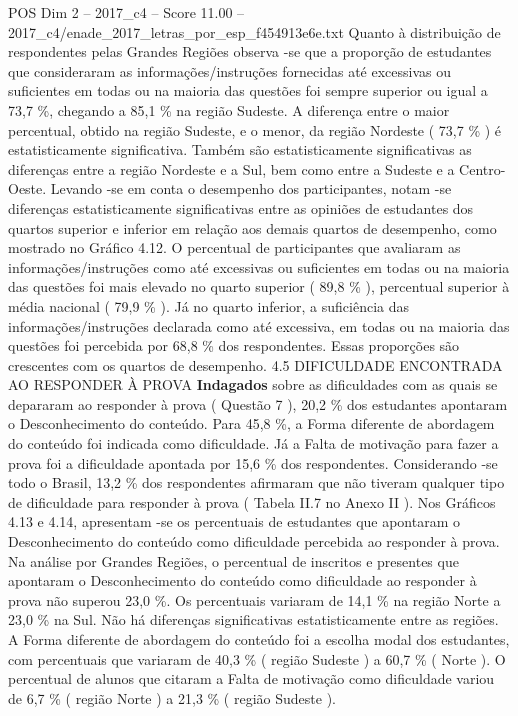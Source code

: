 \begin{textsample}{POS Dim 2 – 2017\_c4 – Score 11.00 – 2017\_c4/enade\_2017\_letras\_por\_esp\_f454913e6e.txt}
Quanto à distribuição de respondentes pelas Grandes Regiões observa -se que a proporção de estudantes que consideraram as informações/instruções fornecidas até excessivas ou suficientes em todas ou na maioria das questões foi sempre superior ou igual a 73,7 \%, chegando a 85,1 \% na região Sudeste.
A diferença entre o maior percentual, obtido na região Sudeste, e o menor, da região Nordeste ( 73,7 \% ) é estatisticamente significativa.
Também são estatisticamente significativas as diferenças entre a região Nordeste e a Sul, bem como entre a Sudeste e a Centro-Oeste.
Levando -se em conta o desempenho dos participantes, notam -se diferenças estatisticamente significativas entre as opiniões de estudantes dos quartos superior e inferior em relação aos demais quartos de desempenho, como mostrado no Gráfico 4.12.
O percentual de participantes que avaliaram as informações/instruções como até excessivas ou suficientes em todas ou na maioria das questões foi mais elevado no quarto superior ( 89,8 \% ), percentual superior à média nacional ( 79,9 \% ).
Já no quarto inferior, a suficiência das informações/instruções declarada como até excessiva, em todas ou na maioria das questões foi percebida por 68,8 \% dos respondentes.
Essas proporções são crescentes com os quartos de desempenho. 4.5 DIFICULDADE ENCONTRADA AO RESPONDER À PROVA \textbf{Indagados} sobre as dificuldades com as quais se depararam ao responder à prova ( Questão 7 ), 20,2 \% dos estudantes apontaram o Desconhecimento do conteúdo.
Para 45,8 \%, a Forma diferente de abordagem do conteúdo foi indicada como dificuldade.
Já a Falta de motivação para fazer a prova foi a dificuldade apontada por 15,6 \% dos respondentes.
Considerando -se todo o Brasil, 13,2 \% dos respondentes afirmaram que não tiveram qualquer tipo de dificuldade para responder à prova ( Tabela II.7 no Anexo II ).
Nos Gráficos 4.13 e 4.14, apresentam -se os percentuais de estudantes que apontaram o Desconhecimento do conteúdo como dificuldade percebida ao responder à prova.
Na análise por Grandes Regiões, o percentual de inscritos e presentes que apontaram o Desconhecimento do conteúdo como dificuldade ao responder à prova não superou 23,0 \%.
Os percentuais variaram de 14,1 \% na região Norte a 23,0 \% na Sul.
Não há diferenças significativas estatisticamente entre as regiões.
A Forma diferente de abordagem do conteúdo foi a escolha modal dos estudantes, com percentuais que variaram de 40,3 \% ( região Sudeste ) a 60,7 \% ( Norte ).
O percentual de alunos que citaram a Falta de motivação como dificuldade variou de 6,7 \% ( região Norte ) a 21,3 \% ( região Sudeste ).

\end{textsample}
